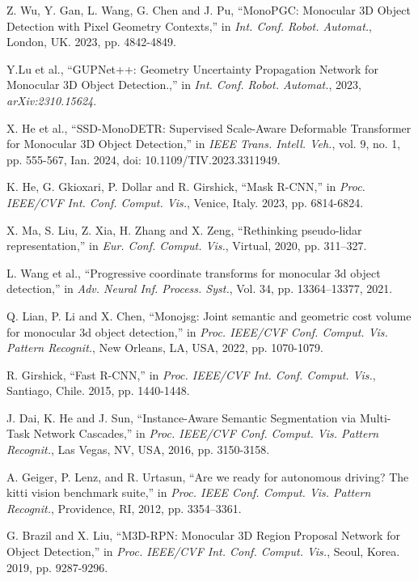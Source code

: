 \documentclass[journal]{IEEEtran}
\begin{document}
\begin{thebibliography}{1}
		Z. Wu, Y. Gan, L. Wang, G. Chen and J. Pu, “MonoPGC: Monocular 3D Object Detection with Pixel Geometry Contexts,” in \textit{Int. Conf. Robot. Automat.}, London, UK. 2023, pp. 4842-4849. 
		
		Y.Lu et al., “GUPNet++: Geometry Uncertainty Propagation Network for Monocular 3D Object Detection.,” in \textit{Int. Conf. Robot. Automat.}, 2023, \textit{arXiv:2310.15624}.
		
		X. He et al., “SSD-MonoDETR: Supervised Scale-Aware Deformable Transformer for Monocular 3D Object Detection,” in \textit{IEEE Trans. Intell. Veh.}, vol. 9, no. 1, pp. 555-567, Ian. 2024, doi: 10.1109/TIV.2023.3311949.
		
		K. He, G. Gkioxari, P. Dollar and R. Girshick, “Mask R-CNN,” in \textit{Proc. IEEE/CVF Int. Conf. Comput. Vis.}, Venice, Italy. 2023, pp. 6814-6824.
		
		X. Ma, S. Liu, Z. Xia, H. Zhang and X. Zeng, “Rethinking pseudo-lidar representation,” in \textit{Eur. Conf. Comput. Vis.}, Virtual, 2020, pp. 311–327.
		
		L. Wang et al., “Progressive coordinate transforms for monocular 3d object detection,” in \textit{Adv. Neural Inf. Process. Syst.}, Vol. 34, pp. 13364--13377, 2021.
		
		Q. Lian, P. Li and X. Chen, “Monojsg: Joint semantic and geometric cost volume for monocular 3d object detection,” in \textit{Proc. IEEE/CVF Conf. Comput. Vis. Pattern Recognit.}, New Orleans, LA, USA, 2022, pp. 1070-1079.
		
		R. Girshick, “Fast R-CNN,” in \textit{Proc. IEEE/CVF Int. Conf. Comput. Vis.}, Santiago, Chile. 2015, pp. 1440-1448.
		
		J. Dai, K. He and J. Sun, “Instance-Aware Semantic Segmentation via Multi-Task Network Cascades,” in \textit{Proc. IEEE/CVF Conf. Comput. Vis. Pattern Recognit.}, Las Vegas, NV, USA, 2016, pp. 3150-3158.
	
		A. Geiger, P. Lenz, and R. Urtasun, “Are we ready for autonomous driving? The kitti vision benchmark suite,” in \textit{Proc. IEEE Conf. Comput. Vis. Pattern Recognit.}, Providence, RI, 2012, pp. 3354–3361.
		
		G. Brazil and X. Liu, “M3D-RPN: Monocular 3D Region Proposal Network for Object Detection,” in \textit{Proc. IEEE/CVF Int. Conf. Comput. Vis.}, Seoul, Korea. 2019, pp. 9287-9296.
		

\end{thebibliography}
\end{document}
